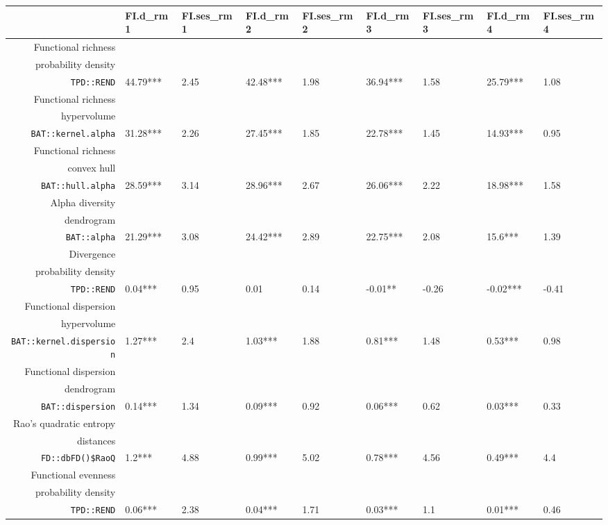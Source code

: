 \begin{table}[ht]
\centering
\scriptsize
\begin{tabular}{rllllllll}
  \hline
 & FI.d\_rm1 & FI.ses\_rm1 & FI.d\_rm2 & FI.ses\_rm2 & FI.d\_rm3 & FI.ses\_rm3 & FI.d\_rm4 & FI.ses\_rm4 \\ 
  \hline
Functional richness\\ probability density\\ \texttt{TPD::REND} & 44.79*** & 2.45 & 42.48*** & 1.98 & 36.94*** & 1.58 & 25.79*** & 1.08 \\ 
  Functional richness\\ hypervolume\\ \texttt{BAT::kernel.alpha} & 31.28*** & 2.26 & 27.45*** & 1.85 & 22.78*** & 1.45 & 14.93*** & 0.95 \\ 
  Functional richness\\ convex hull\\ \texttt{BAT::hull.alpha} & 28.59*** & 3.14 & 28.96*** & 2.67 & 26.06*** & 2.22 & 18.98*** & 1.58 \\ 
  Alpha diversity\\ dendrogram\\ \texttt{BAT::alpha} & 21.29*** & 3.08 & 24.42*** & 2.89 & 22.75*** & 2.08 & 15.6*** & 1.39 \\ 
  Divergence\\ probability density\\ \texttt{TPD::REND} & 0.04*** & 0.95 & 0.01 & 0.14 & -0.01** & -0.26 & -0.02*** & -0.41 \\ 
  Functional dispersion\\ hypervolume\\ \texttt{BAT::kernel.dispersion} & 1.27*** & 2.4 & 1.03*** & 1.88 & 0.81*** & 1.48 & 0.53*** & 0.98 \\ 
  Functional dispersion\\ dendrogram\\ \texttt{BAT::dispersion} & 0.14*** & 1.34 & 0.09*** & 0.92 & 0.06*** & 0.62 & 0.03*** & 0.33 \\ 
  Rao's quadratic entropy\\ distances\\ \texttt{FD::dbFD()\$RaoQ} & 1.2*** & 4.88 & 0.99*** & 5.02 & 0.78*** & 4.56 & 0.49*** & 4.4 \\ 
  Functional evenness\\ probability density\\ \texttt{TPD::REND} & 0.06*** & 2.38 & 0.04*** & 1.71 & 0.03*** & 1.1 & 0.01*** & 0.46 \\ 

\end{tabular}
\end{table}
